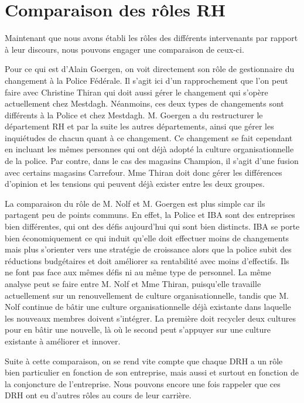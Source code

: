 \section{Comparaison des rôles RH}

Maintenant que nous avons établi les rôles des différents intervenants par rapport à leur discours, nous pouvons engager une comparaison de ceux-ci. \newline


Pour ce qui est d'Alain Goergen, on voit directement son rôle de gestionnaire du changement à la Police Fédérale. Il s'agit ici d'un rapprochement que l'on peut faire avec Christine Thiran qui doit aussi gérer le changement qui s'opère actuellement chez Mestdagh. Néanmoins, ces deux types de changements sont différents à la Police et chez Mestdagh. M. Goergen a du restructurer le département RH et par la suite les autres départements, ainsi que gérer les inquiétudes de chacun quant à ce changement. Ce changement se fait cependant en incluant les mêmes personnes qui ont déjà adopté la culture organisationnelle de la police. Par contre, dans le cas des magasins Champion, il s'agit d'une fusion avec certains magasins Carrefour. Mme Thiran doit donc gérer les différences d'opinion et les tensions qui peuvent déjà exister entre les deux groupes. \newline

La comparaison du rôle de M. Nolf et M. Goergen est plus simple car ils partagent peu de points communs. En effet, la Police et IBA sont des entreprises bien différentes, qui ont des défis aujourd'hui qui sont bien distincts. IBA se porte bien économiquement ce qui induit qu'elle doit effectuer moins de changements mais plus s'orienter vers une stratégie de croissance alors que la police subit des réductions budgétaires et doit améliorer sa rentabilité avec moins d'effectifs. Ils ne font pas face aux mêmes défis ni au même type de personnel. La même analyse peut se faire entre M. Nolf et Mme Thiran, puisqu'elle travaille actuellement sur un renouvellement de culture organisationnelle, tandis que M. Nolf continue de bâtir une culture organisationnelle déjà existante dans laquelle les nouveaux membres doivent s'intégrer. La première doit recycler deux cultures pour en bâtir une nouvelle, là où le second peut s'appuyer sur une culture existante à améliorer et innover.


Suite à cette comparaison, on se rend vite compte que chaque DRH a un rôle bien particulier en fonction de son entreprise, mais aussi et surtout en fonction de la conjoncture de l'entreprise. Nous pouvons encore une fois rappeler que ces DRH ont eu d'autres rôles au cours de leur carrière. 
